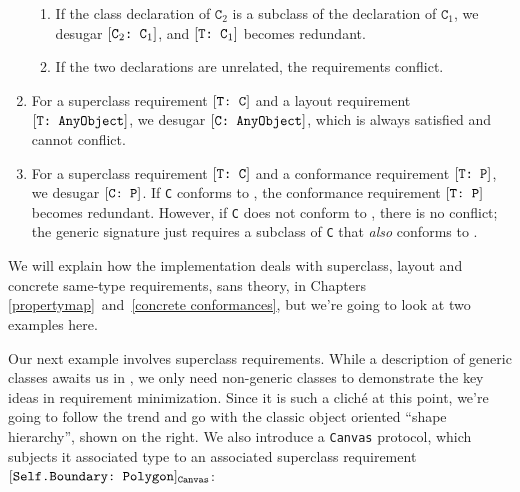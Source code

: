 \documentclass[../generics]{subfiles}
\begin{document}
\begin{definition}
\begin{enumerate}
\begin{enumerate}
\item If the class declaration of $\texttt{C}_2$ is a subclass of the declaration of $\texttt{C}_1$, we desugar $[\texttt{$\texttt{C}_2$:~$\texttt{C}_1$}]$, and $[\texttt{T:~$\texttt{C}_1$}]$ becomes redundant.
\item If the two declarations are unrelated, the requirements conflict.
\end{enumerate}
\item For a superclass requirement $[\texttt{T:~C}]$ and a layout requirement $[\texttt{T:~AnyObject}]$, we desugar $[\texttt{C:~AnyObject}]$, which is always satisfied and cannot conflict.
\item For a superclass requirement $[\texttt{T:~C}]$ and a conformance requirement $[\texttt{T:~P}]$, we desugar $[\texttt{C:~P}]$. If \texttt{C} conforms to \tP, the conformance requirement $[\texttt{T:~P}]$ becomes redundant. However, if \texttt{C} does not conform to \tP, there is no conflict; the generic signature just requires a subclass of \texttt{C} that \emph{also} conforms to \tP.
\end{enumerate}
\end{definition}

We will explain how the implementation deals with superclass, layout and concrete same-type requirements, sans theory, in Chapters \ref{propertymap}~and~\ref{concrete conformances}, but we're going to look at two examples here.

\smallskip

\begin{wrapfigure}[8]{r}{4cm}
\quad{}
\end{wrapfigure}

Our next example involves superclass requirements. While a description of generic classes awaits us in , we only need non-generic classes to demonstrate the key ideas in requirement minimization. Since it is such a clich\'e at this point, we're going to follow the trend and go with the classic object oriented ``shape hierarchy'', shown on the right. We also introduce a \texttt{Canvas} protocol, which subjects it associated type to an associated superclass requirement $[\texttt{Self.Boundary:~Polygon}]_{\texttt{Canvas}}$:
\end{document}
